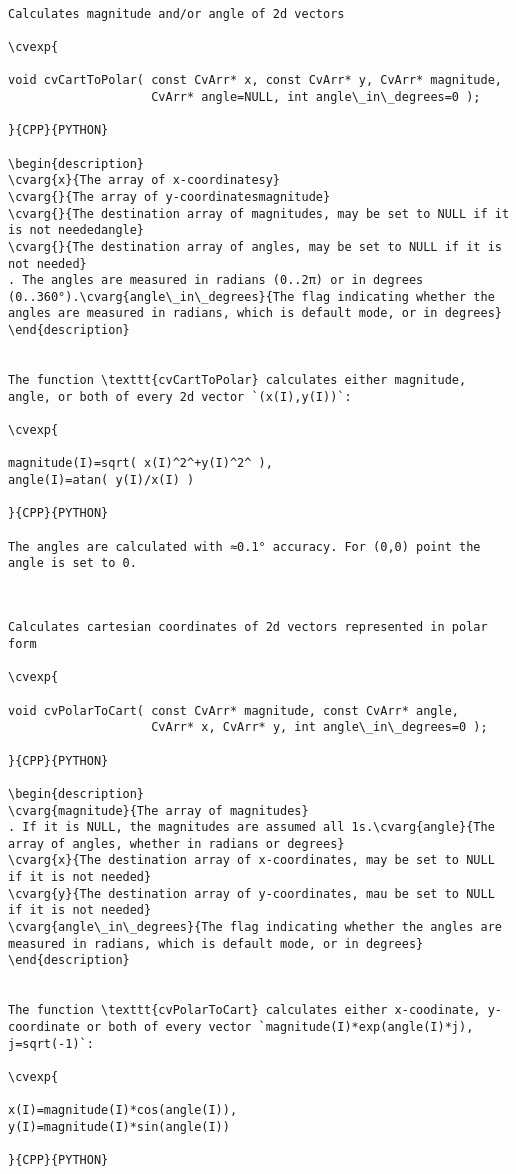 \begin{verbatim}

Calculates magnitude and/or angle of 2d vectors

\cvexp{

void cvCartToPolar( const CvArr* x, const CvArr* y, CvArr* magnitude,
                    CvArr* angle=NULL, int angle\_in\_degrees=0 );

}{CPP}{PYTHON}

\begin{description}
\cvarg{x}{The array of x-coordinatesy}
\cvarg{}{The array of y-coordinatesmagnitude}
\cvarg{}{The destination array of magnitudes, may be set to NULL if it is not neededangle}
\cvarg{}{The destination array of angles, may be set to NULL if it is not needed}
. The angles are measured in radians (0..2π) or in degrees (0..360°).\cvarg{angle\_in\_degrees}{The flag indicating whether the angles are measured in radians, which is default mode, or in degrees}
\end{description}


The function \texttt{cvCartToPolar} calculates either magnitude, angle, or both of every 2d vector `(x(I),y(I))`:

\cvexp{

magnitude(I)=sqrt( x(I)^2^+y(I)^2^ ),
angle(I)=atan( y(I)/x(I) )

}{CPP}{PYTHON}

The angles are calculated with ≈0.1° accuracy. For (0,0) point the angle is set to 0.


\end{verbatim}
\begin{verbatim}

Calculates cartesian coordinates of 2d vectors represented in polar form

\cvexp{

void cvPolarToCart( const CvArr* magnitude, const CvArr* angle,
                    CvArr* x, CvArr* y, int angle\_in\_degrees=0 );

}{CPP}{PYTHON}

\begin{description}
\cvarg{magnitude}{The array of magnitudes}
. If it is NULL, the magnitudes are assumed all 1s.\cvarg{angle}{The array of angles, whether in radians or degrees}
\cvarg{x}{The destination array of x-coordinates, may be set to NULL if it is not needed}
\cvarg{y}{The destination array of y-coordinates, mau be set to NULL if it is not needed}
\cvarg{angle\_in\_degrees}{The flag indicating whether the angles are measured in radians, which is default mode, or in degrees}
\end{description}


The function \texttt{cvPolarToCart} calculates either x-coodinate, y-coordinate or both of every vector `magnitude(I)*exp(angle(I)*j), j=sqrt(-1)`:

\cvexp{

x(I)=magnitude(I)*cos(angle(I)),
y(I)=magnitude(I)*sin(angle(I))

}{CPP}{PYTHON}


\end{verbatim}
